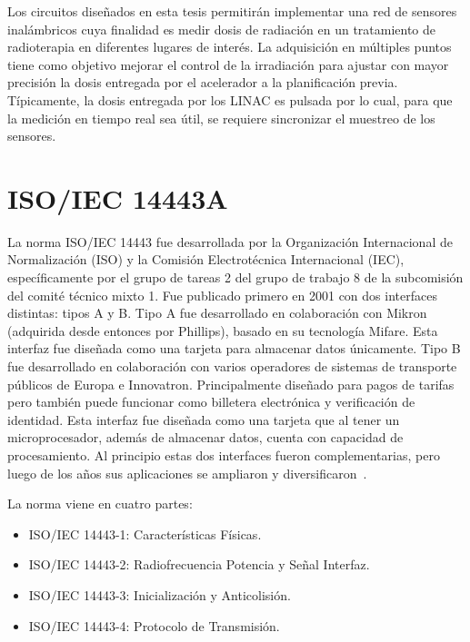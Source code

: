 \documentclass[a4paper, twoside, 11pt]{report}
\begin{document}
Los circuitos diseñados en esta tesis permitirán implementar una red de sensores inalámbricos cuya finalidad es medir dosis de radiación en un tratamiento de radioterapia en diferentes lugares de interés. La adquisición en múltiples puntos tiene como objetivo mejorar el control de la irradiación para ajustar con mayor precisión la dosis entregada por el acelerador a la planificación previa. Típicamente, la dosis entregada por los LINAC es pulsada por lo cual, para que la medición en tiempo real sea útil, se requiere sincronizar el muestreo de los sensores.

\FloatBarrier
\section{ISO/IEC 14443A}

La norma ISO/IEC 14443 fue desarrollada por la Organización Internacional de Normalización (ISO) y la Comisión Electrotécnica Internacional (IEC), específicamente por el grupo de tareas 2 del grupo de trabajo 8 de la subcomisión del comité técnico mixto 1. Fue publicado primero en 2001 con dos interfaces distintas: tipos A y B. Tipo A fue desarrollado en colaboración con Mikron (adquirida desde entonces por Phillips), basado en su tecnología Mifare. Esta interfaz fue diseñada como una tarjeta para almacenar datos únicamente. Tipo B fue desarrollado en colaboración con varios operadores de sistemas de transporte públicos de Europa e Innovatron. Principalmente diseñado para pagos de tarifas pero también puede funcionar como billetera electrónica y verificación de identidad. Esta interfaz fue diseñada como una tarjeta que al tener un microprocesador, además de almacenar datos, cuenta con capacidad de procesamiento. Al principio estas dos interfaces fueron complementarias, pero luego de los años sus aplicaciones se ampliaron y diversificaron~\cite{14443_a_vs_b}.

La norma viene en cuatro partes:

\begin{itemize}
    \item ISO/IEC 14443-1: Características Físicas.
    \item ISO/IEC 14443-2: Radiofrecuencia Potencia y Señal Interfaz.
    \item ISO/IEC 14443-3: Inicialización y Anticolisión.
    \item ISO/IEC 14443-4: Protocolo de Transmisión.
\end{itemize}
\end{document}
